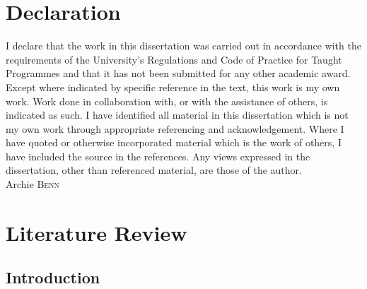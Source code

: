 \documentclass[paper=a4,fontsize=12pt]{scrartcl}
\begin{document}
\section*{Declaration}
I declare that the work in this dissertation was carried out in accordance with the requirements of the University’s Regulations and Code of Practice for Taught Programmes and that it has not been submitted for any other academic award. Except where indicated by specific reference in the text, this work is my own work. Work done in collaboration with, or with the assistance of others, is indicated as such. I have identified all material in this dissertation which is not my own work through appropriate referencing and acknowledgement. Where I have quoted or otherwise incorporated material which is the work of others, I have included the source in the references. Any views expressed in the dissertation, other than referenced material, are those of the author. \newline \\Archie \textsc{Benn} 

\newpage
\tableofcontents
\newpage


\section{Literature Review}
\subsection{Introduction}
\end{document}
